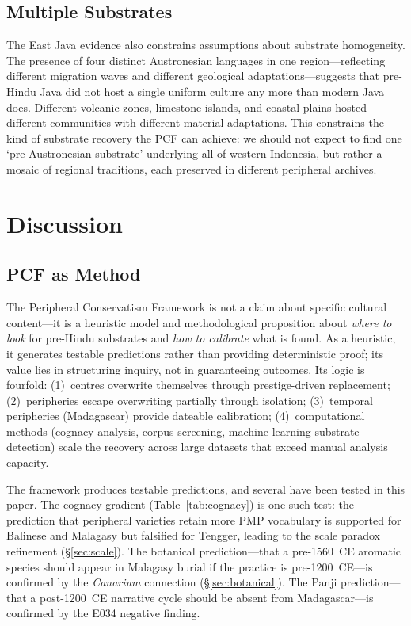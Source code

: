 \documentclass[12pt,a4paper]{article}
\begin{document}
\subsection{Multiple Substrates}

The East Java evidence also constrains assumptions about substrate homogeneity. The presence of four distinct Austronesian languages in one region---reflecting different migration waves and different geological adaptations---suggests that pre-Hindu Java did not host a single uniform culture any more than modern Java does. Different volcanic zones, limestone islands, and coastal plains hosted different communities with different material adaptations. This constrains the kind of substrate recovery the PCF can achieve: we should not expect to find one `pre-Austronesian substrate' underlying all of western Indonesia, but rather a mosaic of regional traditions, each preserved in different peripheral archives.

\section{Discussion}

\subsection{PCF as Method}

The Peripheral Conservatism Framework is not a claim about specific cultural content---it is a heuristic model and methodological proposition about \emph{where to look} for pre-Hindu substrates and \emph{how to calibrate} what is found. As a heuristic, it generates testable predictions rather than providing deterministic proof; its value lies in structuring inquiry, not in guaranteeing outcomes. Its logic is fourfold: (1)~centres overwrite themselves through prestige-driven replacement; (2)~peripheries escape overwriting partially through isolation; (3)~temporal peripheries (Madagascar) provide dateable calibration; (4)~computational methods (cognacy analysis, corpus screening, machine learning substrate detection) scale the recovery across large datasets that exceed manual analysis capacity.

The framework produces testable predictions, and several have been tested in this paper. The cognacy gradient (Table~\ref{tab:cognacy}) is one such test: the prediction that peripheral varieties retain more PMP vocabulary is supported for Balinese and Malagasy but falsified for Tengger, leading to the scale paradox refinement (\S\ref{sec:scale}). The botanical prediction---that a pre-1560~CE aromatic species should appear in Malagasy burial if the practice is pre-1200~CE---is confirmed by the \emph{Canarium} connection (\S\ref{sec:botanical}). The Panji prediction---that a post-1200~CE narrative cycle should be absent from Madagascar---is confirmed by the E034 negative finding.
\end{document}
